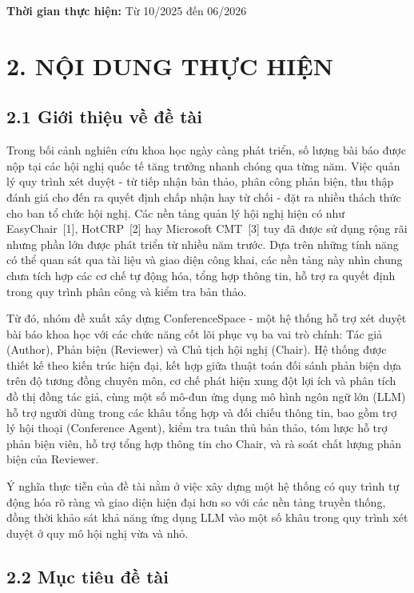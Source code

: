 \noindent\textbf{Thời gian thực hiện:} Từ 10/2025 đến 06/2026

\section*{2. NỘI DUNG THỰC HIỆN}

\subsection*{2.1 Giới thiệu về đề tài}

Trong bối cảnh nghiên cứu khoa học ngày càng phát triển, số lượng bài báo được nộp tại các hội nghị quốc tế tăng trưởng nhanh chóng qua từng năm. Việc quản lý quy trình xét duyệt - từ tiếp nhận bản thảo, phân công phản biện, thu thập đánh giá cho đến ra quyết định chấp nhận hay từ chối - đặt ra nhiều thách thức cho ban tổ chức hội nghị. Các nền tảng quản lý hội nghị hiện có như EasyChair~[1], HotCRP~[2] hay Microsoft CMT~[3] tuy đã được sử dụng rộng rãi nhưng phần lớn được phát triển từ nhiều năm trước. Dựa trên những tính năng có thể quan sát qua tài liệu và giao diện công khai, các nền tảng này nhìn chung chưa tích hợp các cơ chế tự động hóa, tổng hợp thông tin, hỗ trợ ra quyết định trong quy trình phân công và kiểm tra bản thảo.

Từ đó, nhóm đề xuất xây dựng ConferenceSpace - một hệ thống hỗ trợ xét duyệt bài báo khoa học với các chức năng cốt lõi phục vụ ba vai trò chính: Tác giả (Author), Phản biện (Reviewer) và Chủ tịch hội nghị (Chair). Hệ thống được thiết kế theo kiến trúc hiện đại, kết hợp giữa thuật toán đối sánh phản biện dựa trên độ tương đồng chuyên môn, cơ chế phát hiện xung đột lợi ích và phân tích đồ thị đồng tác giả, cùng một số mô-đun ứng dụng mô hình ngôn ngữ lớn (LLM) hỗ trợ người dùng trong các khâu tổng hợp và đối chiếu thông tin, bao gồm trợ lý hội thoại (Conference Agent), kiểm tra tuân thủ bản thảo, tóm lược hỗ trợ phản biện viên, hỗ trợ tổng hợp thông tin cho Chair, và rà soát chất lượng phản biện của Reviewer.

Ý nghĩa thực tiễn của đề tài nằm ở việc xây dựng một hệ thống có quy trình tự động hóa rõ ràng và giao diện hiện đại hơn so với các nền tảng truyền thống, đồng thời khảo sát khả năng ứng dụng LLM vào một số khâu trong quy trình xét duyệt ở quy mô hội nghị vừa và nhỏ.

\subsection*{2.2 Mục tiêu đề tài}

